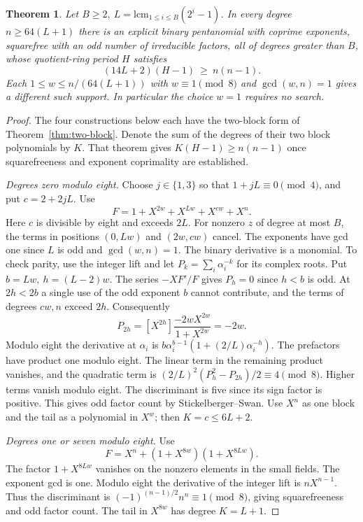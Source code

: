 \documentclass[11pt]{article}
\newtheorem{theorem}{Theorem}
\begin{document}
\begin{theorem}\label{thm:uniform-growing-period}
Let \(B\ge2,\ L=\mathrm{lcm}_{1\le i\le B}(2^i-1)\). In every
degree \(n\ge64(L+1)\) there is an explicit binary pentanomial
with coprime exponents, squarefree with an odd number of irreducible
factors, all of degrees greater than \(B\), whose quotient-ring
period \(H\) satisfies
\[
                   (14L+2)(H-1)\ \ge\ n(n-1).
\]
Each \(1\le w\le n/(64(L+1))\) with \(w\equiv1\pmod8\) and
\(\gcd(w,n)=1\) gives a different such support. In particular the
choice \(w=1\) requires no search.
\end{theorem}
\begin{proof}
The four constructions below each have the two-block form of
Theorem~\ref{thm:two-block}. Denote the sum of the degrees of
their two block polynomials by \(K\). That theorem gives
\(K(H-1)\ge n(n-1)\) once squarefreeness and exponent coprimality
are established.

\emph{Degrees zero modulo eight.} Choose \(j\in\{1,3\}\) so that
\(1+jL\equiv0\pmod4\), and put \(c=2+2jL\). Use
\[
             F=1+X^{2w}+X^{Lw}+X^{cw}+X^n .
\]
Here \(c\) is divisible by eight and exceeds \(2L\).
For nonzero \(z\) of degree at most \(B\), the terms in positions
\((0,Lw)\) and \((2w,cw)\) cancel. The exponents have gcd one
since \(L\) is odd and \(\gcd(w,n)=1\). The binary derivative
is a monomial. To check parity, use the integer lift and let
\(P_k=\sum_i\alpha_i^{-k}\) for its complex roots. Put
\(b=Lw,\ h=(L-2)w\). The series \(-XF'/F\) gives
\(P_h=0\) since \(h<b\) is odd. At \(2h<2b\) a single use of
the odd exponent \(b\) cannot contribute, and the terms of degrees
\(cw,n\) exceed \(2h\). Consequently
\[
   P_{2h}=[X^{2h}]\frac{-2wX^{2w}}{1+X^{2w}}=-2w .
\]
Modulo eight the derivative at \(\alpha_i\) is
\(b\alpha_i^{b-1}(1+(2/L)\alpha_i^{-h})\). The prefactors have
product one modulo eight. The linear term in the remaining product
vanishes, and the quadratic term is
\((2/L)^2(P_h^2-P_{2h})/2\equiv4\pmod8\). Higher terms vanish
modulo eight. The discriminant is five since its sign factor is
positive. This gives odd factor count by Stickelberger--Swan.
Use \(X^n\) as one block and the tail as a polynomial in \(X^w\);
then \(K=c\le6L+2\).

\emph{Degrees one or seven modulo eight.} Use
\[
               F=X^n+(1+X^{8w})(1+X^{8Lw}).
\]
The factor \(1+X^{8Lw}\) vanishes on the nonzero elements in the
small fields. The exponent gcd is one. Modulo eight the derivative
of the integer lift is \(nX^{n-1}\). Thus the discriminant is
\((-1)^{(n-1)/2}n^n\equiv1\pmod8\), giving squarefreeness and
odd factor count. The tail in \(X^{8w}\) has degree \(K=L+1\).


\end{proof}
\end{document}
